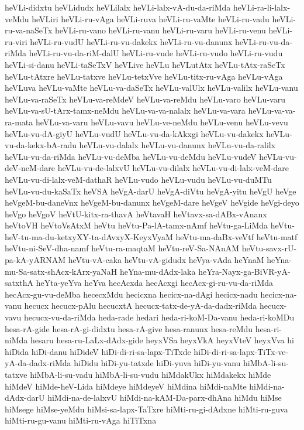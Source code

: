 {heVLi-didxtu
heVLidudx
heVLilalx
heVLi-lalx-vA-du-da-riMda
heVLi-ra-li-lalx-veMdu
heVLiri
heVLi-ru-vAga
heVLi-ruva
heVLi-ru-vaMte
heVLi-ru-vadu
heVLi-ru-va-naSeTx
heVLi-ru-vano
heVLi-ru-vanu
heVLi-ru-varu
heVLi-ru-venu
heVLi-ru-viri
heVLi-ru-vudU
heVLi-ru-vu-dakekx
heVLi-ru-vu-danunx
heVLi-ru-vu-da-riMda
heVLi-ru-vu-da-riM-dalU
heVLi-ru-vude
heVLi-ru-vudo
heVLi-ru-vudu
heVLi-si-danu
heVLi-taSeTxV
heVLive
heVLu
heVLutAtx
heVLu-tAtx-raSeTx
heVLu-tAtxre
heVLu-tatxve
heVLu-tetxVve
heVLu-titx-ru-vAga
heVLu-vAga
heVLuva
heVLu-vaMte
heVLu-va-daSeTx
heVLu-valUlx
heVLu-valilx
heVLu-vanu
heVLu-va-raSeTx
heVLu-va-reMdeV
heVLu-va-reMdu
heVLu-varo
heVLu-varu
heVLu-va-sU-tArx-tamx-neMdu
heVLu-va-va-nalalx
heVLu-va-vara
heVLu-va-va-ra-mata
heVLu-va-varu
heVLu-vavu
heVLu-ve-neMdu
heVLu-venu
heVLu-vevu
heVLu-vu-dA-giyU
heVLu-vudU
heVLu-vu-da-kAkxgi
heVLu-vu-dakekx
heVLu-vu-da-kekx-bA-radu
heVLu-vu-dalalx
heVLu-vu-danunx
heVLu-vu-da-ralilx
heVLu-vu-da-riMda
heVLu-vu-deMba
heVLu-vu-deMdu
heVLu-vudeV
heVLu-vu-deV-neM-dare
heVLu-vu-de-lalxvU
heVLu-vu-dilalx
heVLu-vu-di-lalx-veM-dare
heVLu-vu-di-lalx-veM-dathaR
heVLu-vudo
heVLu-vudu
heVLu-vu-duMTu
heVLu-vu-du-kaSaTx
heVSA
heVgA-darU
heVgA-diVtu
heVgA-yitu
heVgU
heVge
heVgeM-bu-daneVnx
heVgeM-bu-danunx
heVgeM-dare
heVgeV
heVgide
heVgi-deyo
heVgo
heVgoV
heVtU-kitx-ra-thavA
heVtavaH
heVtavx-sa-dABx-vAnanx
heVtoVH
heVtoVsAtxM
heVtu
heVtu-Pa-lA-tamx-nAmf
heVtu-ga-LiMda
heVtu-heV-tu-ma-du-ketxyXY-ta-dAvxyX-KeyxVyaM
heVtu-ma-daBx-veVtf
heVtu-matf
heVtu-ni-SeV-dha-namf
heVtu-ra-maqtaM
heVtu-reV-Sa-NAnAM
heVtu-savx-rU-pa-kA-yARNAM
heVtu-vA-caka
heVtu-vA-gidudx
heVya-vAda
heYnaM
heYna-mu-Sa-satx-shAcx-kArx-yaNaH
heYna-mu-dAdx-laka
heYra-Nayx-ga-BiVR-yA-satxthA
heYta-yeYva
heYva
hecAcxda
hecAcxgi
hecAcx-gi-ru-vu-da-riMda
hecAcx-gu-vu-deMba
hececxMdu
hecicxna
hecicx-na-dAgi
hecicx-nadu
hecicx-na-vanu
hecucx
hecucx-pAlu
hecucxtA
hecucx-tatx-de-yA-da-dadx-riMda
hecucx-vavu
hecucx-vu-da-riMda
heda-rade
hedari
heda-ri-koM-Da-vanu
heda-ri-koMDu
hesa-rA-gide
hesa-rA-gi-didxtu
hesa-rA-give
hesa-ranunx
hesa-reMdu
hesa-ri-niMda
hesaru
hesa-ru-LaLx-dAdx-gide
heyxVSa
heyxVkA
heyxVteV
heyxVva
hi
hiDida
hiDi-danu
hiDideV
hiDi-di-ri-sa-lapx-TiTxde
hiDi-di-ri-sa-lapx-TiTx-ve-yA-da-dadx-riMda
hiDidu
hiDi-yu-tatxde
hiDi-yuva
hiDi-yu-vanu
hiMbA-li-su-tatxve
hiMbA-li-su-vadu
hiMbA-li-su-vudu
hiMdakUkx
hiMdakekx
hiMde
hiMdeV
hiMde-heV-Lida
hiMdeye
hiMdeyeV
hiMdina
hiMdi-naMte
hiMdi-na-dAdx-darU
hiMdi-na-de-lalxvU
hiMdi-na-kAM-Da-parx-dhAna
hiMdu
hiMse
hiMsege
hiMse-yeMdu
hiMsi-sa-lapx-TaTxre
hiMti-ru-gi-dAdxne
hiMti-ru-guva
hiMti-ru-gu-vanu
hiMti-ru-vAga
hiTiTxna
}
